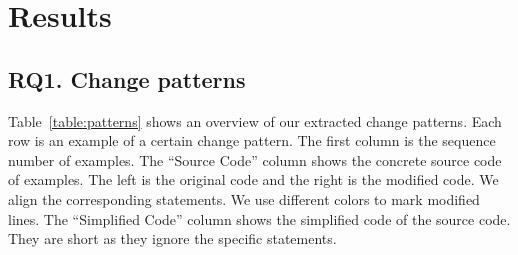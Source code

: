 \section{Results}
\label{sec:result}
\subsection{RQ1. Change patterns}
\label{sec:result:pattern}






Table~\ref{table:patterns} shows an overview of our extracted change patterns. Each row is an example of a certain change pattern. The first column is the sequence number of examples. The ``Source Code'' column shows the concrete source code of examples. The left is the original code and the right is the modified code. We align the corresponding statements. We use different colors to mark modified lines. The ``Simplified Code'' column shows the simplified code of the source code. They are short as they ignore the specific statements.

